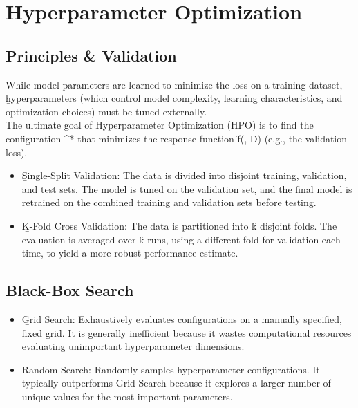 \section{Hyperparameter Optimization}

\subsection{Principles \& Validation}
While model parameters are learned to minimize the loss on a training dataset, \b{hyperparameters} (which control model complexity, learning characteristics, and optimization choices) must be tuned externally.\\
The ultimate goal of Hyperparameter Optimization (HPO) is to find the configuration \f{\lambda^*} that minimizes the response function \f{f(\lambda, D)} (e.g., the validation loss).
\begin{itemize}
\item \b{Single-Split Validation}: The data is divided into disjoint training, validation, and test sets. The model is tuned on the validation set, and the final model is retrained on the combined training and validation sets before testing.
\item \b{K-Fold Cross Validation}: The data is partitioned into \f{k} disjoint folds. The evaluation is averaged over \f{k} runs, using a different fold for validation each time, to yield a more robust performance estimate.
\end{itemize}







\subsection{Black-Box Search}

\begin{itemize}
\item \b{Grid Search}: Exhaustively evaluates configurations on a manually specified, fixed grid. It is generally inefficient because it wastes computational resources evaluating unimportant hyperparameter dimensions.
\item \b{Random Search}: Randomly samples hyperparameter configurations. It typically outperforms Grid Search because it explores a larger number of unique values for the most important parameters.
\end{itemize}





